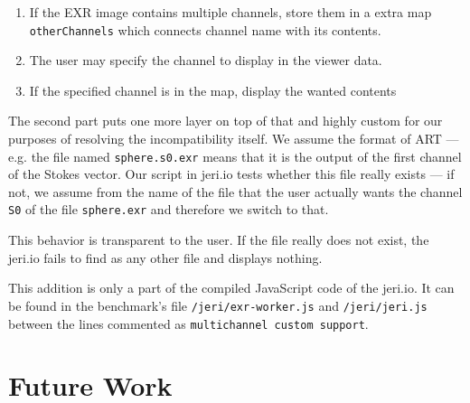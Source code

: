 \begin{enumerate}
	\item If the EXR image contains multiple channels, store them in a extra map \texttt{otherChannels} which connects channel name with its contents.
	\item The user may specify the channel to display in the viewer data.
	\item If the specified channel is in the map, display the wanted contents
\end{enumerate}

The second part puts one more layer on top of that and highly custom for our purposes of resolving the incompatibility itself. We assume the format of ART --- e.g. the file named \texttt{sphere.s0.exr} means that it is the output of the first channel of the Stokes vector. Our script in jeri.io tests whether this file really exists --- if not, we assume from the name of the file that the user actually wants the channel \texttt{S0} of the file \texttt{sphere.exr} and therefore we switch to that.

This behavior is transparent to the user. If the file really does not exist, the jeri.io fails to find as any other file and displays nothing.

This addition is only a part of the compiled JavaScript code of the jeri.io. It can be found in the benchmark's file \texttt{/jeri/exr-worker.js} and \texttt{/jeri/jeri.js} between the lines commented as \texttt{multichannel custom support}.

\section{Future Work}
